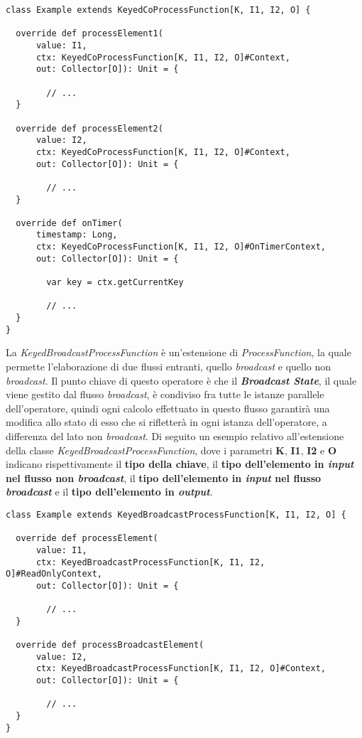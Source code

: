 \begin{verbatim}
class Example extends KeyedCoProcessFunction[K, I1, I2, O] {

  override def processElement1(
      value: I1, 
      ctx: KeyedCoProcessFunction[K, I1, I2, O]#Context, 
      out: Collector[O]): Unit = {
      
      	// ...
  }
  
  override def processElement2(
      value: I2, 
      ctx: KeyedCoProcessFunction[K, I1, I2, O]#Context, 
      out: Collector[O]): Unit = {
      
      	// ...
  }

  override def onTimer(
      timestamp: Long, 
      ctx: KeyedCoProcessFunction[K, I1, I2, O]#OnTimerContext, 
      out: Collector[O]): Unit = {
      
      	var key = ctx.getCurrentKey
      
      	// ...
  }
}
\end{verbatim}
La \textit{KeyedBroadcastProcessFunction} è un'estensione di \textit{ProcessFunction}, la quale permette l'elaborazione di due flussi entranti, quello \textit{broadcast} e quello non \textit{broadcast}. Il punto chiave di questo operatore è che il \textbf{\textit{Broadcast State}}, il quale viene gestito dal flusso \textit{broadcast}, è condiviso fra tutte le istanze parallele dell'operatore, quindi ogni calcolo effettuato in questo flusso garantirà una modifica allo stato di esso che si rifletterà in ogni istanza dell'operatore, a differenza del lato non \textit{broadcast}. Di seguito un esempio relativo all'estensione della classe \textit{KeyedBroadcastProcessFunction}, dove i parametri \textbf{K}, \textbf{I1}, \textbf{I2} e \textbf{O} indicano rispettivamente il \textbf{tipo della chiave}, il \textbf{tipo dell'elemento in \textit{input} nel flusso non \textit{broadcast}}, il \textbf{tipo dell'elemento in \textit{input} nel flusso \textit{broadcast}} e il \textbf{tipo dell'elemento in \textit{output}}.
\begin{verbatim}
class Example extends KeyedBroadcastProcessFunction[K, I1, I2, O] {

  override def processElement(
      value: I1, 
      ctx: KeyedBroadcastProcessFunction[K, I1, I2, O]#ReadOnlyContext, 
      out: Collector[O]): Unit = {
      
      	// ...
  }
  
  override def processBroadcastElement(
      value: I2, 
      ctx: KeyedBroadcastProcessFunction[K, I1, I2, O]#Context, 
      out: Collector[O]): Unit = {
      
      	// ...
  }
}
\end{verbatim}

